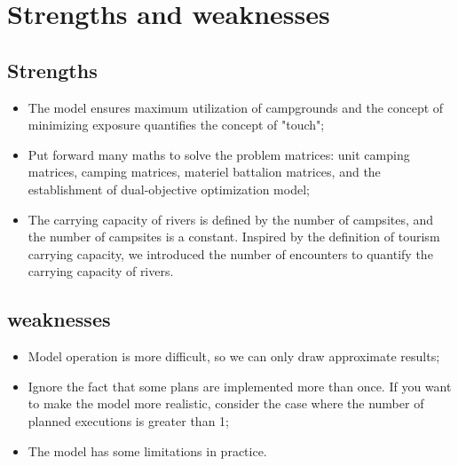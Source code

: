 \section{Strengths and weaknesses}
\subsection{Strengths}
\begin{itemize}
	\item The model ensures maximum utilization of campgrounds and the concept of minimizing exposure quantifies the concept of "touch";
	\item Put forward many maths to solve the problem matrices: unit camping matrices, camping matrices, materiel battalion matrices, and the establishment of dual-objective optimization model;
	\item The carrying capacity of rivers is defined by the number of campsites, and the number of campsites is a constant. Inspired by the definition of tourism carrying capacity, we introduced the number of encounters to quantify the carrying capacity of rivers.
\end{itemize}
\subsection{weaknesses}
\begin{itemize}
	\item Model operation is more difficult, so we can only draw approximate results;
	\item Ignore the fact that some plans are implemented more than once. If you want to make the model more realistic, consider the case where the number of planned executions is greater than 1;
	\item The model has some limitations in practice.
\end{itemize}